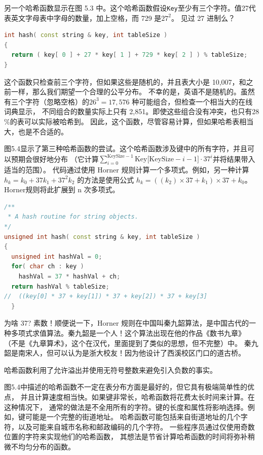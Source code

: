 \documentclass[a4paper]{ctexart}
\theoremstyle{definition}
\theoremstyle{definition}
\begin{document}
另一个哈希函数显示在图 5.3 中。这个哈希函数假设\texttt{Key}至少有三个字符。值27代表英文字母表中字母的数量，加上空格，而 729 是\(27^2\)。
见过 27 进制么？
\begin{lstlisting}[language=C++]
int hash( const string & key, int tableSize )
{
  return ( key[ 0 ] + 27 * key[ 1 ] + 729 * key[ 2 ] ) % tableSize;
}  
\end{lstlisting}
这个函数只检查前三个字符，但如果这些是随机的，并且表大小是 10,007，和之前一样，那么我们期望一个合理的公平分布。
不幸的是，英语不是随机的。虽然有三个字符（忽略空格）的\(26^3 = 17,576\) 种可能组合，但检查一个相当大的在线词典显示，
不同组合的数量实际上只有 2,851。即使这些组合没有冲突，也只有28 \%的表可以实际被哈希到。
因此，这个函数，尽管容易计算，但如果哈希表相当大，也是不合适的。

图5.4显示了第三种哈希函数的尝试。这个哈希函数涉及键中的所有字符，并且可以预期会很好地分布
（它计算\(\sum_{i=0}^{\text{KeySize}-1} \text{Key[KeySize} - i - 1] \cdot 37^i\)并将结果带入适当的范围）。
代码通过使用 Horner 规则计算一个多项式。例如，另一种计算\(h_k = k_0 + 37k_1 + 37^2k_2\) 的方法是使用公式 \(h_k = ((k_2) \times 37 + k_1) \times 37 + k_0\)。
Horner规则将此扩展到 n 次多项式。

\begin{lstlisting}[language=C++]
/**
 * A hash routine for string objects.
*/
unsigned int hash( const string & key, int tableSize )
{
  unsigned int hashVal = 0;
  for( char ch : key )
    hashVal = 37 * hashVal + ch;
  return hashVal % tableSize;
//  ((key[0] * 37 + key[1]) * 37 + key[2]) * 37 + key[3]  
  }  
\end{lstlisting}

为啥 37? 素数！顺便说一下，Horner 规则在中国叫秦九韶算法，是中国古代的一种多项式求值算法。秦九韶是一个人！这个算法出现在他的作品《数书九章》
（不是《九章算术》，这个在汉代，里面提到了类似的思想，但不完整）中。
秦九韶是南宋人，但可以认为是浙大校友！因为他设计了西溪校区门口的道古桥。

哈希函数利用了允许溢出并使用无符号整数来避免引入负数的事实。

图5.4中描述的哈希函数不一定在表分布方面是最好的，但它具有极端简单性的优点，
并且计算速度相当快。如果键非常长，哈希函数将花费太长时间来计算。在这种情况下，
通常的做法是不全用所有的字符。键的长度和属性将影响选择。例如，键可能是一个完整的街道地址。
哈希函数可能包括来自街道地址的几个字符，以及可能来自城市名称和邮政编码的几个字符。
一些程序员通过仅使用奇数位置的字符来实现他们的哈希函数，
其想法是节省计算哈希函数的时间将弥补稍微不均匀分布的函数。
\end{document}
